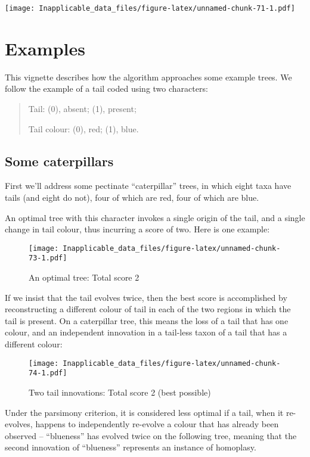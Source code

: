\documentclass[]{book}
\theoremstyle{definition}
\theoremstyle{definition}
\theoremstyle{definition}
\theoremstyle{remark}
\begin{document}
\texttt{[image: Inapplicable\_data\_files/figure-latex/unnamed-chunk-71-1.pdf]}

\hypertarget{examples}{%
\chapter{Examples}\label{examples}}

This vignette describes how the algorithm approaches some example trees.
We follow the example of a tail coded using two characters:

\begin{quote}
Tail: (0), absent; (1), present;

Tail colour: (0), red; (1), blue.
\end{quote}

\hypertarget{some-caterpillars}{%
\section{Some caterpillars}\label{some-caterpillars}}

First we'll address some pectinate ``caterpillar'' trees, in which eight
taxa have tails (and eight do not), four of which are red, four of which
are blue.

An optimal tree with this character invokes a single origin of the tail,
and a single change in tail colour, thus incurring a score of two. Here
is one example:

\begin{figure}
\centering
\texttt{[image: Inapplicable\_data\_files/figure-latex/unnamed-chunk-73-1.pdf]}
\caption{\label{fig:unnamed-chunk-73}An optimal tree: Total score 2}
\end{figure}

If we insist that the tail evolves twice, then the best score is
accomplished by reconstructing a different colour of tail in each of the
two regions in which the tail is present. On a caterpillar tree, this
means the loss of a tail that has one colour, and an independent
innovation in a tail-less taxon of a tail that has a different colour:

\begin{figure}
\centering
\texttt{[image: Inapplicable\_data\_files/figure-latex/unnamed-chunk-74-1.pdf]}
\caption{\label{fig:unnamed-chunk-74}Two tail innovations: Total score 2
(best possible)}
\end{figure}

Under the parsimony criterion, it is considered less optimal if a tail,
when it re-evolves, happens to independently re-evolve a colour that has
already been observed -- ``blueness'' has evolved twice on the following
tree, meaning that the second innovation of ``blueness'' represents an
instance of homoplasy.
\end{document}
